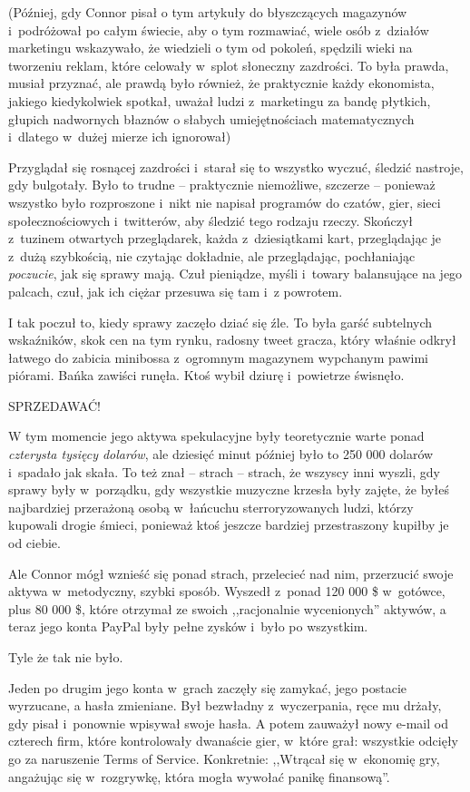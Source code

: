 \documentclass[oneside,polish,11pt,rmheadings]{mwbk}
\begin{document}
(Później, gdy Connor pisał o tym artykuły do błyszczących magazynów i~podróżował po całym świecie, aby o tym rozmawiać, wiele osób z~działów marketingu wskazywało, że wiedzieli o tym od pokoleń, spędzili wieki na tworzeniu reklam, które celowały w~splot słoneczny zazdrości. To była prawda, musiał przyznać, ale prawdą było również, że praktycznie każdy ekonomista, jakiego kiedykolwiek spotkał, uważał ludzi z~marketingu za bandę płytkich, głupich nadwornych błaznów o słabych umiejętnościach matematycznych i~dlatego w~dużej mierze ich ignorował)

Przyglądał się rosnącej zazdrości i~starał się to wszystko wyczuć, śledzić nastroje, gdy bulgotały. Było to trudne -- praktycznie niemożliwe, szczerze -- ponieważ wszystko było rozproszone i~nikt nie napisał programów do czatów, gier, sieci społecznościowych i~twitterów, aby śledzić tego rodzaju rzeczy. Skończył z~tuzinem otwartych przeglądarek, każda z~dziesiątkami kart, przeglądając je z~dużą szybkością, nie czytając dokładnie, ale przeglądając, pochłaniając \textit{poczucie}, jak się sprawy mają. Czuł pieniądze, myśli i~towary balansujące na jego palcach, czuł, jak ich ciężar przesuwa się tam i~z powrotem.

I tak poczuł to, kiedy sprawy zaczęło dziać się źle. To była garść subtelnych wskaźników, skok cen na tym rynku, radosny tweet gracza, który właśnie odkrył łatwego do zabicia minibossa z~ogromnym magazynem wypchanym pawimi piórami. Bańka zawiści runęła. Ktoś wybił dziurę i~powietrze świsnęło.

\noindent SPRZEDAWAĆ!

W tym momencie jego aktywa spekulacyjne były teoretycznie warte ponad \textit{czterysta tysięcy dolarów}, ale dziesięć minut później było to 250 000 dolarów i~spadało jak skała. To też znał -- strach -- strach, że wszyscy inni wyszli, gdy sprawy były w~porządku, gdy wszystkie muzyczne krzesła były zajęte, że byłeś najbardziej przerażoną osobą w~łańcuchu sterroryzowanych ludzi, którzy kupowali drogie śmieci, ponieważ ktoś jeszcze bardziej przestraszony kupiłby je od ciebie.

Ale Connor mógł wznieść się ponad strach, przelecieć nad nim, przerzucić swoje aktywa w~metodyczny, szybki sposób. Wyszedł z~ponad 120 000 \$ w~gotówce, plus 80 000 \$, które otrzymał ze swoich ,,racjonalnie wycenionych'' aktywów, a teraz jego konta PayPal były pełne zysków i~było po wszystkim.

Tyle że tak nie było.

Jeden po drugim jego konta w~grach zaczęły się zamykać, jego postacie wyrzucane, a hasła zmieniane. Był bezwładny z~wyczerpania, ręce mu drżały, gdy pisał i~ponownie wpisywał swoje hasła. A potem zauważył nowy e-mail od czterech firm, które kontrolowały dwanaście gier, w~które grał: wszystkie odcięły go za naruszenie Terms of Service. Konkretnie: ,,Wtrącał się w~ekonomię gry, angażując się w~rozgrywkę, która mogła wywołać panikę finansową''.
\end{document}
